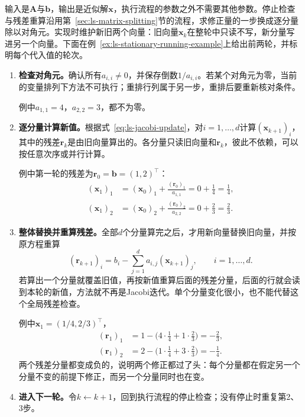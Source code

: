 输入是$\bm A$与$\bm b$，输出是近似解$\bm x$，执行流程的参数之外不需要其他参数。停止检查与残差重算沿用第~\ref{sec:ls-matrix-splitting}节的流程，求修正量的一步换成逐分量除以对角元。实现时维护新旧两个向量：旧向量$\bm x_k$在整轮中只读不写，新分量写进另一个向量。下面在例~\ref{ex:ls-stationary-running-example}上给出前两轮，并标明每个代入值的轮次。
\begin{enumerate}
 \item \textbf{检查对角元。}确认所有$a_{i,i}\neq0$，并保存倒数$1/a_{i,i}$。若某个对角元为零，当前的变量排列下方法不可执行；重排行列属于另一步，重排后要重新核对条件。

 例中$a_{1,1}=4$，$a_{2,2}=3$，都不为零。

 \item \textbf{逐分量计算新值。}根据式~\eqref{eq:ls-jacobi-update}，对$i=1,\ldots,d$计算$(\bm x_{k+1})_i$，其中的残差$\bm r_k$是由旧向量算出的。各分量只读旧向量和$\bm r_k$，彼此不依赖，可以按任意次序或并行计算。

 例中第一轮的残差为$\bm r_0=\bm b=(1,2)^\top$：
 \[
  \begin{aligned}
  (\bm x_1)_1&=(\bm x_0)_1+\frac{(\bm r_0)_1}{a_{1,1}}=0+\frac14=\frac14,\\
  (\bm x_1)_2&=(\bm x_0)_2+\frac{(\bm r_0)_2}{a_{2,2}}=0+\frac23=\frac23 .
  \end{aligned}
 \]

 \item \textbf{整体替换并重算残差。}全部$d$个分量算完之后，才用新向量替换旧向量，并按原方程重算
 \[
  (\bm r_{k+1})_i=b_i-\sum_{j=1}^d a_{i,j}(\bm x_{k+1})_j ,\qquad i=1,\ldots,d .
 \]
 若算出一个分量就覆盖旧值，再按新值重算后面的残差分量，后面的行就会读到本轮的新值，方法就不再是Jacobi迭代。单个分量变化很小，也不能代替这个全局残差检查。

 例中$\bm x_1=(1/4,2/3)^\top$，
 \[
  \begin{aligned}
  (\bm r_1)_1&=1-\bigl(4\cdot\tfrac14+1\cdot\tfrac23\bigr)=-\tfrac23,\\
  (\bm r_1)_2&=2-\bigl(1\cdot\tfrac14+3\cdot\tfrac23\bigr)=-\tfrac14 .
  \end{aligned}
 \]
 两个残差分量都变成负的，说明两个修正都过了头：每个分量都在假定另一个分量不变的前提下修正，而另一个分量同时也在变。

 \item \textbf{进入下一轮。}令$k\leftarrow k+1$，回到执行流程的停止检查；没有停止时重复第2、3步。


\end{enumerate}
